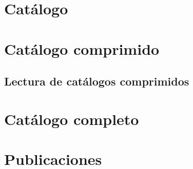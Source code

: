 \section{Catálogo}
\label{sec:clasificacion:catalogo}










\section{Catálogo comprimido}
\label{sec:clasificacion:catalogo-comprimido}







\subsection{Lectura de catálogos comprimidos}
\label{sec:clasificacion:catalogo-comprimido:lectura}









\section{Catálogo completo}
\label{sec:clasificacion:catalogo-completo}







\section{Publicaciones}
\label{sec:clasificacion:publicaciones}







